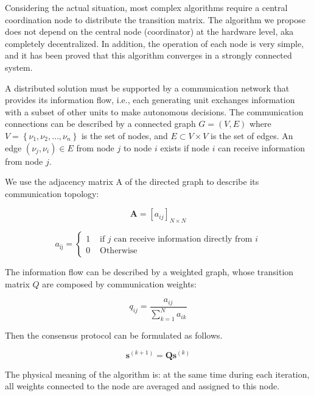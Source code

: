 \documentclass[conference]{IEEEtran}
\begin{document}
Considering the actual situation, most complex algorithms require a central coordination node to distribute the transition matrix. The algorithm we propose does not depend on the central node (coordinator) at the hardware level, aka completely decentralized. In addition, the operation of each node is very simple, and it has been proved that this algorithm converges in a strongly connected system.

A distributed solution must be supported by a communication network that provides its information flow, i.e., each generating unit exchanges information with a subset of other units to make autonomous decisions\cite{binetti2013distributed}. The communication connections can be described by a connected graph $G=(V, E)$ where $V=\left\{\nu_{1}, \nu_{2}, \ldots, \nu_{n}\right\}$ is the set of nodes, and $E \subset V \times V$
is the set of edges. An edge $\left(\nu_{j}, \nu_{i}\right) \in E$ from node $j$ to node $i$ exists if node $i$ can receive information from node $j$.

We use the adjacency matrix A of the directed graph to describe its communication topology:

\begin{equation}
    \mathbf{A}=\left[a_{i j}\right]_{N \times N}
\end{equation}

\begin{equation}
    a_{\mathrm{ij}}=\left\{\begin{array}{ll}
    {1} & {\text { if } j \text{ can receive information directly from } i } \\
    {0} & {\text { Otherwise }}
    \end{array}\right.
\end{equation}

The information flow can be described by a weighted graph, whose transition matrix $Q$ are composed by communication weights:

\begin{equation}
    q_{i j}=\frac{a_{i j}}{\sum_{k=1}^{N} a_{i k}}
\end{equation}

Then the consensus protocol can be formulated as follows.

\begin{equation}\boldsymbol{s}^{(k+1)}=\boldsymbol{Q} \boldsymbol{s}^{(k)}\end{equation}

The physical meaning of the algorithm is: at the same time during each iteration, all weights connected to the node are averaged and assigned to this node.
\end{document}

